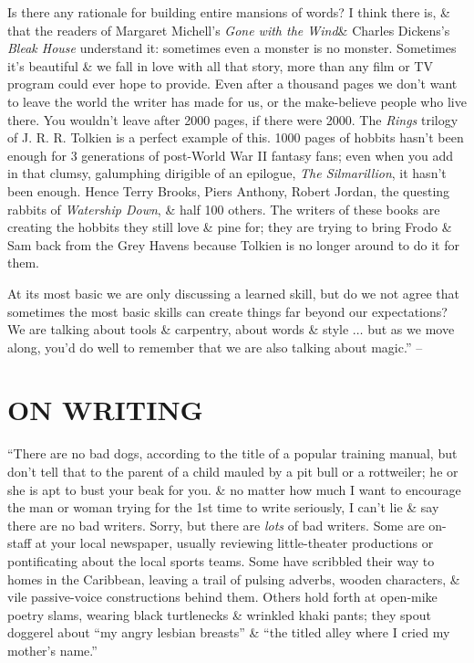 \documentclass{article}
\numberwithin{equation}{section}
\begin{document}
Is there any rationale for building entire mansions of words? I think there is, \& that the readers of Margaret Michell's \textit{Gone with the Wind}\& Charles Dickens's \textit{Bleak House} understand it: sometimes even a monster is no monster. Sometimes it's beautiful \& we fall in love with all that story, more than any film or TV program could ever hope to provide. Even after a thousand pages we don't want to leave the world the writer has made for us, or the make-believe people who live there. You wouldn't leave after 2000 pages, if there were 2000. The \textit{Rings} trilogy of J. R. R. Tolkien is a perfect example of this. 1000 pages of hobbits hasn't been enough for 3 generations of post-World War II fantasy fans; even when you add in that clumsy, galumphing dirigible of an epilogue, \textit{The Silmarillion}, it hasn't been enough. Hence Terry Brooks, Piers Anthony, Robert Jordan, the questing rabbits of \textit{Watership Down}, \& half 100 others. The writers of these books are creating the hobbits they still love \& pine for; they are trying to bring Frodo \& Sam back from the Grey Havens because Tolkien is no longer around to do it for them.

At its most basic we are only discussing a learned skill, but do we not agree that sometimes the most basic skills can create things far beyond our expectations? We are talking about tools \& carpentry, about words \& style $\ldots$ but as we move along, you'd do well to remember that we are also talking about magic.'' -- \cite[pp. 86--107]{King2010}


\section{ON WRITING}
``There are no bad dogs, according to the title of a popular training manual, but don't tell that to the parent of a child mauled by a pit bull or a rottweiler; he or she is apt to bust your beak for you. \& no matter how much I want to encourage the man or woman trying for the 1st time to write seriously, I can't lie \& say there are no bad writers. Sorry, but there are \textit{lots} of bad writers. Some are on-staff at your local newspaper, usually reviewing little-theater productions or pontificating about the local sports teams. Some have scribbled their way to homes in the Caribbean, leaving a trail of pulsing adverbs, wooden characters, \& vile passive-voice constructions behind them. Others hold forth at open-mike poetry slams, wearing black turtlenecks \& wrinkled khaki pants; they spout doggerel about ``my angry lesbian breasts'' \& ``the titled alley where I cried my mother's name.''
\end{document}
